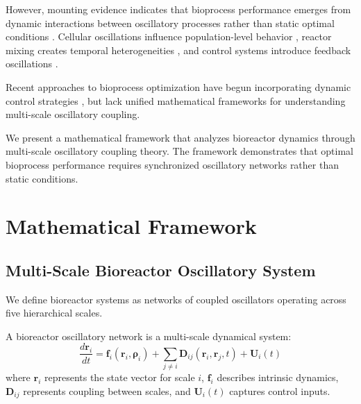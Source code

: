 \documentclass[twocolumn]{article}
\begin{document}
However, mounting evidence indicates that bioprocess performance emerges from dynamic interactions between oscillatory processes rather than static optimal conditions \citep{fredrickson2006statistics,nielsen2003principles}. Cellular oscillations influence population-level behavior \citep{kotte2014phenotypic}, reactor mixing creates temporal heterogeneities \citep{enfors2001physiological}, and control systems introduce feedback oscillations \citep{stephanopoulos1984chemical}.

Recent approaches to bioprocess optimization have begun incorporating dynamic control strategies \citep{craven2014process,mandenius2016bioprocess}, but lack unified mathematical frameworks for understanding multi-scale oscillatory coupling.

We present a mathematical framework that analyzes bioreactor dynamics through multi-scale oscillatory coupling theory. The framework demonstrates that optimal bioprocess performance requires synchronized oscillatory networks rather than static conditions.

\section{Mathematical Framework}

\subsection{Multi-Scale Bioreactor Oscillatory System}

We define bioreactor systems as networks of coupled oscillators operating across five hierarchical scales.

\begin{definition}
A bioreactor oscillatory network is a multi-scale dynamical system:
\begin{equation}
\frac{d\mathbf{r}_i}{dt} = \mathbf{f}_i(\mathbf{r}_i, \boldsymbol{\rho}_i) + \sum_{j \neq i} \mathbf{D}_{ij}(\mathbf{r}_i, \mathbf{r}_j, t) + \mathbf{U}_i(t)
\label{eq:reactor_network}
\end{equation}
where $\mathbf{r}_i$ represents the state vector for scale $i$, $\mathbf{f}_i$ describes intrinsic dynamics, $\mathbf{D}_{ij}$ represents coupling between scales, and $\mathbf{U}_i(t)$ captures control inputs.
\end{definition}
\end{document}
